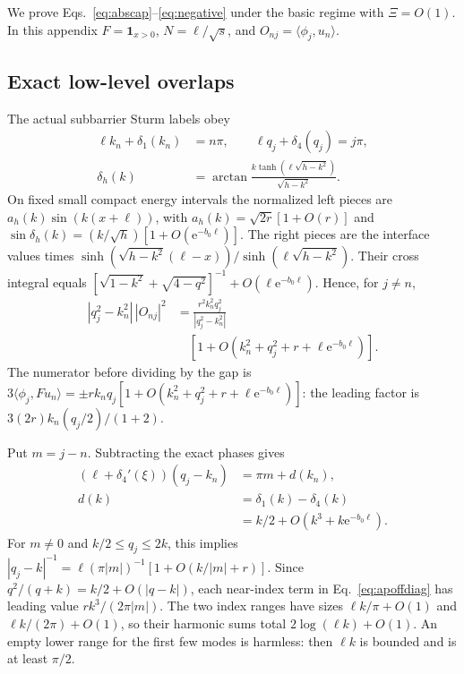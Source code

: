 \documentclass[aps,pra,reprint,superscriptaddress,longbibliography]{revtex4-2}
\newcommand{\ee}{\mathrm e}
\newcommand{\ip}[2]{\langle#1,#2\rangle}
\newcommand{\one}{\mathbf 1}
\begin{document}
We prove Eqs.~\eqref{eq:abscap}--\eqref{eq:negative} under the
basic regime with $\Xi=O(1)$. In this appendix $F=\one_{x>0}$,
$N=\ell/\sqrt s$, and $O_{nj}=\ip{\phi_j}{u_n}$.

\subsection{Exact low-level overlaps}

The actual subbarrier Sturm labels obey
\begin{align}
 \ell k_n+\delta_1(k_n)&=n\pi,\qquad
 \ell q_j+\delta_4(q_j)=j\pi,\nonumber\\
 \delta_h(k)&=\arctan\frac{k\tanh(\ell\sqrt{h-k^2})}
                                  {\sqrt{h-k^2}}.        \label{eq:apsharpphase}
\end{align}
On fixed small compact energy intervals the normalized left pieces
are $a_h(k)\sin(k(x+\ell))$, with
$a_h(k)=\sqrt{2r}[1+O(r)]$ and
$\sin\delta_h(k)=(k/\sqrt h)[1+O(\ee^{-b_0\ell})]$.
The right pieces are the interface values times
$\sinh(\sqrt{h-k^2}(\ell-x))/\sinh(\ell\sqrt{h-k^2})$.
Their cross integral equals
$[\sqrt{1-k^2}+\sqrt{4-q^2}]^{-1}+O(\ell\ee^{-b_0\ell})$.
Hence, for $j\ne n$,
\begin{align}
 |q_j^2-k_n^2|\,|O_{nj}|^2
 &=\frac{r^2k_n^2q_j^2}{|q_j^2-k_n^2|}\nonumber\\
 &\quad[1+O(k_n^2+q_j^2+r+\ell\ee^{-b_0\ell})].          \label{eq:apoffdiag}
\end{align}
The numerator before dividing by the gap is
$3\ip{\phi_j}{Fu_n}=\pm rk_nq_j[1+O(k_n^2+q_j^2+r+
\ell\ee^{-b_0\ell})]$: the leading factor is
$3(2r)k_n(q_j/2)/(1+2)$.

Put $m=j-n$. Subtracting the exact phases gives
\begin{align}
 (\ell+\delta_4'(\xi))(q_j-k_n)&=\pi m+d(k_n),\nonumber\\
 d(k)&=\delta_1(k)-\delta_4(k)
                \nonumber\\
 &=k/2+O(k^3+k\ee^{-b_0\ell}).                            \label{eq:apgap}
\end{align}
For $m\ne0$ and $k/2\le q_j\le2k$, this implies
$|q_j-k|^{-1}=\ell(\pi|m|)^{-1}[1+O(k/|m|+r)]$.
Since $q^2/(q+k)=k/2+O(|q-k|)$, each near-index term in
Eq.~\eqref{eq:apoffdiag} has leading value $rk^3/(2\pi|m|)$.
The two index ranges have sizes $\ell k/\pi+O(1)$ and
$\ell k/(2\pi)+O(1)$, so their harmonic sums total
$2\log(\ell k)+O(1)$. An empty lower range for the first few modes
is harmless: then $\ell k$ is bounded and is at least $\pi/2$.
\end{document}
